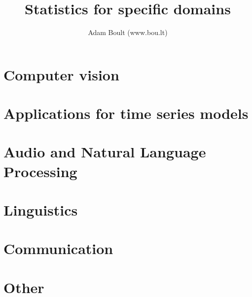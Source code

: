 \documentclass[oneside]{book}
\begin{document}
\author{Adam Boult (www.bou.lt)}
\title{Statistics for specific domains}
\maketitle

\setcounter{tocdepth}{0}
\tableofcontents



\part{Computer vision}





\part{Applications for time series models}




\part{Audio and Natural Language Processing}




\part{Linguistics}




\part{Communication}






\part{Other}

\end{document}
